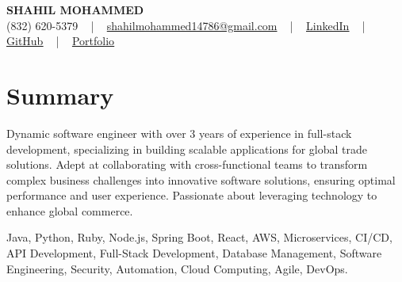 \documentclass[letterpaper,10pt]{article}
\begin{document}
\begin{center}
    {\fontsize{14pt}{12pt}\selectfont \textbf{\MakeUppercase{Shahil Mohammed}}}\\ \vspace{2pt}
    \fontsize{10pt}{12pt}\selectfont (832) 620-5379 ~ | ~ \href{mailto:shahilmohammed14786@gmail.com}{shahilmohammed14786@gmail.com} ~ | ~  
    \href{https://www.linkedin.com/in/shahil-mohammed-9652931a1/}{\color{blue}\underline{LinkedIn}}  ~ | ~ 
    \href{https://github.com/freakbeast14}{\color{blue}\underline{GitHub}} ~ | ~ 
    \href{https://shahil-mohammed.netlify.app/}{\color{blue}\underline{Portfolio}}
    \vspace{-8pt}
\end{center}

\section{Summary}
\vspace{-2pt}\fontsize{8pt}{9pt}\selectfont
Dynamic software engineer with over 3 years of experience in full-stack development, specializing in building scalable applications for global trade solutions. Adept at collaborating with cross-functional teams to transform complex business challenges into innovative software solutions, ensuring optimal performance and user experience. Passionate about leveraging technology to enhance global commerce.
\vspace{-5pt}

{\fontsize{1pt}{1pt}\selectfont\color{white}
Java, Python, Ruby, Node.js, Spring Boot, React, AWS, Microservices, CI/CD, API Development, Full-Stack Development, Database Management, Software Engineering, Security, Automation, Cloud Computing, Agile, DevOps.
}
\vspace{-8pt}

\vspace{-2pt}
\end{document}
